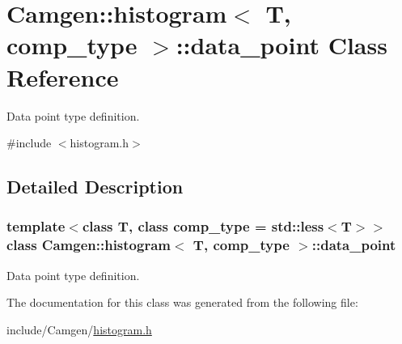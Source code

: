 \hypertarget{a00116}{\section{Camgen\-:\-:histogram$<$ T, comp\-\_\-type $>$\-:\-:data\-\_\-point Class Reference}
\label{a00116}
}


Data point type definition.  




{\ttfamily \#include $<$histogram.\-h$>$}



\subsection{Detailed Description}
\subsubsection*{template$<$class T, class comp\-\_\-type = std\-::less$<$\-T$>$$>$class Camgen\-::histogram$<$ T, comp\-\_\-type $>$\-::data\-\_\-point}

Data point type definition. 

The documentation for this class was generated from the following file\-:\begin{DoxyCompactItemize}
\item 
include/\-Camgen/\hyperlink{a00645}{histogram.\-h}\end{DoxyCompactItemize}
